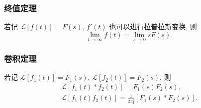 \subsubsection{终值定理}
若记 $\mathcal{L}[f(t)]=F(s)$, $f'(t)$ 也可以进行拉普拉斯变换, 则
\begin{equation}
    \lim_{t\rightarrow\infty}f(t)=\lim_{s\rightarrow 0}sF(s).
\end{equation}

\subsubsection{卷积定理}
若记 $\mathcal{L}[f_1(t)]=F_1(s)$, $\mathcal{L}[f_2(t)]=F_2(s)$, 则
\begin{gather}
    \mathcal{L}[f_1(t)*f_2(t)]=F_1(s)F_2(s), \label{eq:4.2 conv t} \\
    \mathcal{L}[f_1(t)f_2(t)]=\frac{1}{2\pi\mathrm{j}}[F_1(s)*F_2(s)]. \label{eq:4.2 conv s}
\end{gather}
